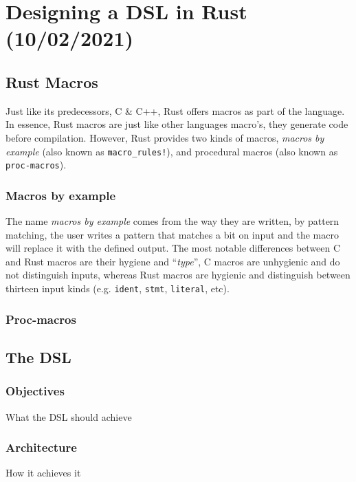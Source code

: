 \chapter{Designing a DSL in Rust (10/02/2021)}\label{cha:rust-dsl}

\section{Rust Macros}

Just like its predecessors, C \& C++, Rust offers macros as part of the language.
In essence, Rust macros are just like other languages macro's, they generate code before compilation.
However, Rust provides two kinds of macros, \emph{macros by example} (also known as \texttt{macro\_rules!}),
and procedural macros (also known as \texttt{proc-macros}).

\subsection{Macros by example}

The name \emph{macros by example} comes from the way they are written, by pattern matching,
the user writes a pattern that matches a bit on input and the macro will replace it with the defined output.
The most notable differences between C and Rust macros are their hygiene and “\emph{type}”,
C macros are unhygienic and do not distinguish inputs, whereas Rust macros are hygienic
and distinguish between thirteen input kinds (e.g. \texttt{ident}, \texttt{stmt}, \texttt{literal}, etc).


\subsection{Proc-macros}

\section{The DSL}
\subsection{Objectives}
What the DSL should achieve
\subsection{Architecture}
How it achieves it